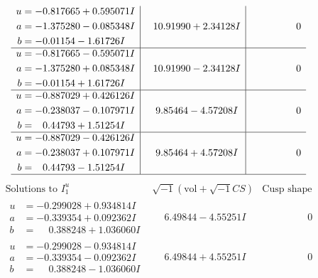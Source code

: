 \documentclass[1p]{elsarticle_modified}
\theoremstyle{definition}
\newcommand{\I}{\sqrt{-1}}
\begin{document}
$$\begin{array}{c|c|c}
\begin{aligned}
u &= -0.817665 + 0.595071 I \\
a &= -1.375280 - 0.085348 I \\
b &= -0.01154 - 1.61726 I\end{aligned}
 & \phantom{-}10.91990 + 2.34128 I & \phantom{-0.000000 } 0 \\ \hline\begin{aligned}
u &= -0.817665 - 0.595071 I \\
a &= -1.375280 + 0.085348 I \\
b &= -0.01154 + 1.61726 I\end{aligned}
 & \phantom{-}10.91990 - 2.34128 I & \phantom{-0.000000 } 0 \\ \hline\begin{aligned}
u &= -0.887029 + 0.426126 I \\
a &= -0.238037 - 0.107971 I \\
b &= \phantom{-}0.44793 + 1.51254 I\end{aligned}
 & \phantom{-}9.85464 - 4.57208 I & \phantom{-0.000000 } 0 \\ \hline\begin{aligned}
u &= -0.887029 - 0.426126 I \\
a &= -0.238037 + 0.107971 I \\
b &= \phantom{-}0.44793 - 1.51254 I\end{aligned}
 & \phantom{-}9.85464 + 4.57208 I & \phantom{-0.000000 } 0\\
 \hline 
 \end{array}$$\newpage$$\begin{array}{c|c|c}  
\text{Solutions to }I^u_{1}& \I (\text{vol} + \sqrt{-1}CS) & \text{Cusp shape}\\
 \hline 
\begin{aligned}
u &= -0.299028 + 0.934814 I \\
a &= -0.339354 + 0.092362 I \\
b &= \phantom{-}0.388248 + 1.036060 I\end{aligned}
 & \phantom{-}6.49844 - 4.55251 I & \phantom{-0.000000 } 0 \\ \hline\begin{aligned}
u &= -0.299028 - 0.934814 I \\
a &= -0.339354 - 0.092362 I \\
b &= \phantom{-}0.388248 - 1.036060 I\end{aligned}
 & \phantom{-}6.49844 + 4.55251 I & \phantom{-0.000000 } 0 \\ \hline\begin{aligned}

\end{aligned}
\end{array}$$
\end{document}
